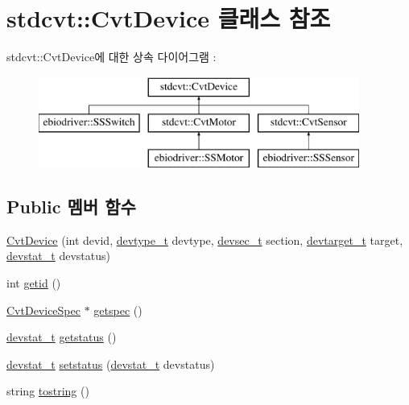 \hypertarget{classstdcvt_1_1CvtDevice}{}\section{stdcvt\+:\+:Cvt\+Device 클래스 참조}
\label{classstdcvt_1_1CvtDevice}
stdcvt\+:\+:Cvt\+Device에 대한 상속 다이어그램 \+: \begin{figure}[H]
\begin{center}
\leavevmode
\includegraphics[height=3.000000cm]{classstdcvt_1_1CvtDevice}
\end{center}
\end{figure}
\subsection*{Public 멤버 함수}
\begin{DoxyCompactItemize}
\item 
\hyperlink{classstdcvt_1_1CvtDevice_abd4b781d9c72a5550a4fd181a86968e2}{Cvt\+Device} (int devid, \hyperlink{cvtcode_8h_ae8e34073e35cef0bb47c7fa535fc638b}{devtype\+\_\+t} devtype, \hyperlink{cvtcode_8h_a268eebb73363e24b9e65fd51973bd9c0}{devsec\+\_\+t} section, \hyperlink{cvtcode_8h_a2b37fd5cc4d40c0b8c4b987c271e5ceb}{devtarget\+\_\+t} target, \hyperlink{cvtcode_8h_ad21cd565f839adc5b19a0993e7da7278}{devstat\+\_\+t} devstatus)
\item 
int \hyperlink{classstdcvt_1_1CvtDevice_a1500a6c99ce552fed452a3a9fea6c390}{getid} ()
\item 
\hyperlink{classstdcvt_1_1CvtDeviceSpec}{Cvt\+Device\+Spec} $\ast$ \hyperlink{classstdcvt_1_1CvtDevice_a29928ec55be4697cb7ba86268fa6aa8a}{getspec} ()
\item 
\hyperlink{cvtcode_8h_ad21cd565f839adc5b19a0993e7da7278}{devstat\+\_\+t} \hyperlink{classstdcvt_1_1CvtDevice_a87d2288d6211d897e4c2a6c9905f5ff3}{getstatus} ()
\item 
\hyperlink{cvtcode_8h_ad21cd565f839adc5b19a0993e7da7278}{devstat\+\_\+t} \hyperlink{classstdcvt_1_1CvtDevice_a6962f56199cccff1c0687ad5087cb211}{setstatus} (\hyperlink{cvtcode_8h_ad21cd565f839adc5b19a0993e7da7278}{devstat\+\_\+t} devstatus)
\item 
string \hyperlink{classstdcvt_1_1CvtDevice_a93b54587e1940918b825d78b18f48062}{tostring} ()
\end{DoxyCompactItemize}


